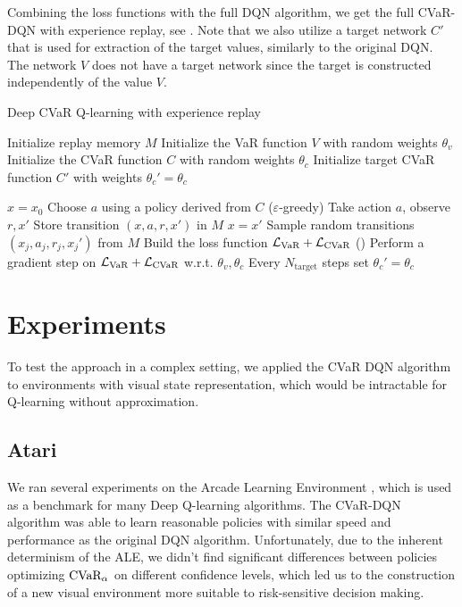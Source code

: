 Combining the loss functions with the full DQN algorithm, we get the full CVaR-DQN with experience replay, see . Note that we also utilize a target network $C'$ that is used for extraction of the target values, similarly to the original DQN. The network $V$ does not have a target network since the target is constructed independently of the value $V$.
\begin{algorithm}
\caption{Deep CVaR Q-learning with experience replay}
\begin{algorithmic}\label{alg:cvardqn}

    \STATE Initialize replay memory $M$
    \STATE Initialize the VaR function $V$ with random weights $\theta_v$
    \STATE Initialize the CVaR function $C$ with random weights $\theta_c$
    \STATE Initialize target CVaR function $C'$ with weights $\theta_c'=\theta_c$

    \STATE $x=x_0$
	\STATE Choose $a$ using a policy derived from $C$ ($\varepsilon$-greedy)
	\STATE Take action $a$, observe $r, x'$
	\STATE Store transition $(x, a, r, x')$ in $M$
	\STATE $x = x'$
	\STATE Sample random transitions $(x_j, a_j, r_j, x_j')$ from $M$
	\STATE Build the loss function $\mathcal{L}_{\text{VaR}} + \mathcal{L}_{\text{CVaR}}$ ()
    \STATE Perform a gradient step on $\mathcal{L}_{\text{VaR}} + \mathcal{L}_{\text{CVaR}}$ w.r.t. $\theta_v, \theta_c$
    \STATE Every $N_\text{target}$ steps set $\theta_c'=\theta_c$
	\ENDWHILE
	\ENDFOR
	
\end{algorithmic}
\end{algorithm}

\newpage

\section{Experiments}

To test the approach in a complex setting, we applied the CVaR DQN algorithm to environments with visual state representation, which would be intractable for Q-learning without approximation. 

\subsection{Atari}
We ran several experiments on the Arcade Learning Environment \citep{bellemare13arcade}, which is used as a benchmark for many Deep Q-learning algorithms. The CVaR-DQN algorithm was able to learn reasonable policies with similar speed and performance as the original DQN algorithm. Unfortunately, due to the inherent determinism of the ALE, we didn't find significant differences between policies optimizing $\text{CVaR}_\alpha$ on different confidence levels, which led us to the construction of a new visual environment more suitable to risk-sensitive decision making.

